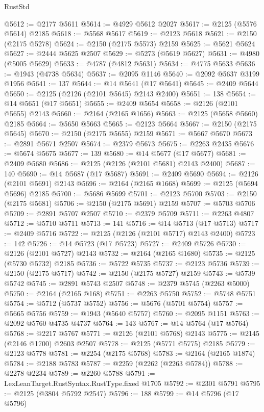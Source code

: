 \begin{lexlean}{RustStd}
\begin{coremodule}
@5612 := @2177 @5611
@5614 := @4929 @5612 @2027
@5617 := @2125 (@5576 @5614) @2185
@5618 := @5568 @5617
@5619 := @2123 @5618
@5621 := @2150 (@2175 @5278)
@5624 := @2150 (@2175 @5573) @2159
@5625 := @5621 @5624
@5627 := @2444 @5625 @2507
@5629 := @5273 (@5619 @5627)
@5631 := @4980 (@5005 @5629)
@5633 := @4787 (@4812 @5631)
@5634 := @4775 @5633
@5636 := @1943 (@4738 @5634)
@5637 := @2095 @1146
@5640 := @2092 @5637 @3199 @1956
@5641 := 137
@5644 := @14 @5641 (@17 @5641)
@5645 := @2409 @5644
@5650 := @2125 (@2126 (@2101 @5645) @2143 @2400)
@5651 := 138
@5654 := @14 @5651 (@17 @5651)
@5655 := @2409 @5654
@5658 := @2126 (@2101 @5655) @2143
@5660 := @2164 (@2165 @1656)
@5663 := @2125 (@5658 @5660) @2185
@5664 := @5650 @5663
@5665 := @2123 @5664
@5667 := @2150 (@2175 @5645)
@5670 := @2150 (@2175 @5655) @2159
@5671 := @5667 @5670
@5673 := @2891 @5671 @2507
@5674 := @2379 @5673
@5675 := @2263 @2435
@5676 := @5674 @5675
@5677 := 139
@5680 := @14 @5677 (@17 @5677)
@5681 := @2409 @5680
@5686 := @2125 (@2126 (@2101 @5681) @2143 @2400)
@5687 := 140
@5690 := @14 @5687 (@17 @5687)
@5691 := @2409 @5690
@5694 := @2126 (@2101 @5691) @2143
@5696 := @2164 (@2165 @1668)
@5699 := @2125 (@5694 @5696) @2185
@5700 := @5686 @5699
@5701 := @2123 @5700
@5703 := @2150 (@2175 @5681)
@5706 := @2150 (@2175 @5691) @2159
@5707 := @5703 @5706
@5709 := @2891 @5707 @2507
@5710 := @2379 @5709
@5711 := @2263 @4807
@5712 := @5710 @5711
@5713 := 141
@5716 := @14 @5713 (@17 @5713)
@5717 := @2409 @5716
@5722 := @2125 (@2126 (@2101 @5717) @2143 @2400)
@5723 := 142
@5726 := @14 @5723 (@17 @5723)
@5727 := @2409 @5726
@5730 := @2126 (@2101 @5727) @2143
@5732 := @2164 (@2165 @1680)
@5735 := @2125 (@5730 @5732) @2185
@5736 := @5722 @5735
@5737 := @2123 @5736
@5739 := @2150 (@2175 @5717)
@5742 := @2150 (@2175 @5727) @2159
@5743 := @5739 @5742
@5745 := @2891 @5743 @2507
@5748 := @2379 @5745 (@2263 @5000)
@5750 := @2164 (@2165 @168)
@5751 := @2263 @5750
@5752 := @5748 @5751
@5754 := @5712 (@5737 @5752)
@5756 := @5676 (@5701 @5754)
@5757 := @5665 @5756
@5759 := @1943 (@5640 @5757)
@5760 := @2095 @1151
@5763 := @2092 @5760 @4735 @4737
@5764 := 143
@5767 := @14 @5764 (@17 @5764)
@5768 := @2217 @5767
@5771 := @2126 (@2101 @5768) @2143
@5775 := @2145 (@2146 @1700) @2603 @2507
@5778 := @2125 (@5771 @5775) @2185
@5779 := @2123 @5778
@5781 := @2254 (@2175 @5768)
@5783 := @2164 (@2165 @1874)
@5784 := @2188 @5783
@5787 := @2259 (@2262 (@2263 @5784))
@5788 := @2278 @2234
@5789 := @2260 @5788
@5791 := LexLeanTarget.RustSyntax.RustType.fixed @1705
@5792 := @2301 @5791
@5795 := @2125 (@3804 @5792 @2547)
@5796 := 188
@5799 := @14 @5796 (@17 @5796)

\end{coremodule}
\end{lexlean}
